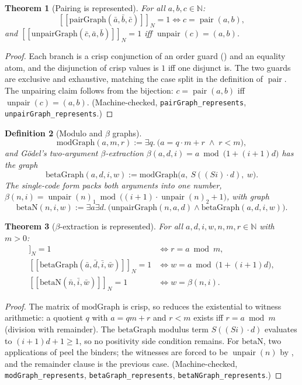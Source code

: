 \documentclass[11pt,a4paper]{article}
\newtheorem{theorem}{Theorem}[section]
\newtheorem{definition}[theorem]{Definition}
\newcommand{\Nat}{\mathbb{N}}
\newcommand{\evalc}[2]{[\![ {#2} ]\!]_{#1}}
\newcommand{\pair}{\operatorname{pair}}
\newcommand{\unpair}{\operatorname{unpair}}
\begin{document}
\begin{theorem}[Pairing is represented]
\label{thm:pair-rep}
For all $a, b, c \in \Nat$:
\[
  \evalc{N}{\mathrm{pairGraph}(\bar a, \bar b, \bar c)} = 1
  \iff c = \pair(a,b),
\]
and
$\evalc{N}{\mathrm{unpairGraph}(\bar c, \bar a, \bar b)} = 1$ iff
$\unpair(c) = (a,b)$.
\end{theorem}
\begin{proof}
Each branch is a crisp conjunction of an order guard
() and an equality atom, and the disjunction of crisp
values is $1$ iff one disjunct is.
The two guards are exclusive and exhaustive, matching the case split in
the definition of $\pair$.
The unpairing claim follows from the bijection:
$c = \pair(a,b)$ iff $\unpair(c) = (a,b)$.
(Machine-checked, \texttt{pairGraph\_represents},
\texttt{unpairGraph\_represents}.)
\end{proof}

\begin{definition}[Modulo and $\beta$ graphs]
\label{def:betagraph}
\[
  \mathrm{modGraph}(a,m,r) :=
  \exists q.\ \bigl(a = q \cdot m + r \;\wedge\; r < m\bigr),
\]
and G\"odel's two-argument $\beta$-extraction
$\beta(a,d,i) = a \bmod \bigl(1 + (i+1)d\bigr)$ has the graph
\[
  \mathrm{betaGraph}(a,d,i,w) :=
  \mathrm{modGraph}\bigl(a,\ S((Si) \cdot d),\ w\bigr).
\]
The single-code form packs both arguments into one number,
$\beta(n, i) = \unpair(n)_1 \bmod \bigl((i+1) \cdot \unpair(n)_2 + 1\bigr)$,
with graph
\[
  \mathrm{betaN}(n,i,w) :=
  \exists a \exists d.\
  \bigl(\mathrm{unpairGraph}(n,a,d)
    \wedge \mathrm{betaGraph}(a,d,i,w)\bigr).
\]
\end{definition}

\begin{theorem}[$\beta$-extraction is represented]
\label{thm:beta-rep}
For all $a, d, i, w, n, m, r \in \Nat$ with $m > 0$:
\begin{align*}
  \evalc{N}{\mathrm{modGraph}(\bar a, \bar m, \bar r)} = 1
    &\iff r = a \bmod m,\\
  \evalc{N}{\mathrm{betaGraph}(\bar a, \bar d, \bar i, \bar w)} = 1
    &\iff w = a \bmod \bigl(1 + (i+1)d\bigr),\\
  \evalc{N}{\mathrm{betaN}(\bar n, \bar i, \bar w)} = 1
    &\iff w = \beta(n, i).
\end{align*}
\end{theorem}
\begin{proof}
The matrix of $\mathrm{modGraph}$ is crisp, so 
reduces the existential to witness arithmetic: a quotient $q$ with
$a = qm + r$ and $r < m$ exists iff $r = a \bmod m$ (division with
remainder).
The $\mathrm{betaGraph}$ modulus term $S((Si) \cdot d)$ evaluates to
$(i+1)d + 1 \geq 1$, so no positivity side condition remains.
For $\mathrm{betaN}$, two applications of  peel the
binders; the witnesses are forced to be $\unpair(n)$ by
, and the remainder clause is the previous case.
(Machine-checked, \texttt{modGraph\_represents},
\texttt{betaGraph\_represents}, \texttt{betaNGraph\_represents}.)
\end{proof}
\end{document}

